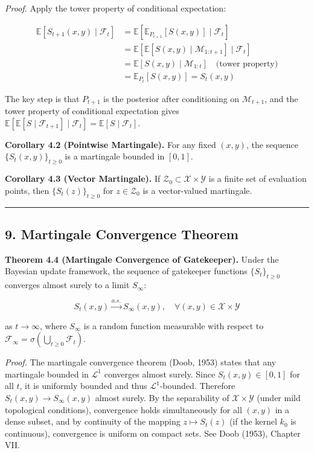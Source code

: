 \documentclass[
  12pt,
]{article}
\begin{document}
\emph{Proof.} Apply the tower property of conditional expectation:

\[
\begin{aligned}
\mathbb{E}[S_{t+1}(x,y) \mid \mathcal{F}_t] &= \mathbb{E}[\mathbb{E}_{P_{t+1}}[S(x,y)] \mid \mathcal{F}_t] \\
&= \mathbb{E}[\mathbb{E}[S(x,y) \mid \mathcal{M}_{1:t+1}] \mid \mathcal{F}_t] \\
&= \mathbb{E}[S(x,y) \mid \mathcal{M}_{1:t}] \quad \text{(tower property)} \\
&= \mathbb{E}_{P_t}[S(x,y)] = S_t(x,y)
\end{aligned}
\]

The key step is that \(P_{t+1}\) is the posterior after conditioning on
\(\mathcal{M}_{t+1}\), and the tower property of conditional expectation
gives
\(\mathbb{E}[\mathbb{E}[S \mid \mathcal{F}_{t+1}] \mid \mathcal{F}_t] = \mathbb{E}[S \mid \mathcal{F}_t]\).

\textbf{Corollary 4.2 (Pointwise Martingale).} For any fixed \((x,y)\),
the sequence \(\{S_t(x,y)\}_{t \geq 0}\) is a martingale bounded in
\([0,1]\).

\textbf{Corollary 4.3 (Vector Martingale).} If
\(\mathcal{Z}_0 \subset \mathcal{X} \times \mathcal{Y}\) is a finite set
of evaluation points, then \(\{S_t(z)\}_{t \geq 0}\) for
\(z \in \mathcal{Z}_0\) is a vector-valued martingale.

\begin{center}\rule{0.5\linewidth}{0.5pt}\end{center}

\subsection{9. Martingale Convergence
Theorem}\label{martingale-convergence-theorem}

\textbf{Theorem 4.4 (Martingale Convergence of Gatekeeper).} Under the
Bayesian update framework, the sequence of gatekeeper functions
\(\{S_t\}_{t \geq 0}\) converges almost surely to a limit \(S_\infty\):

\[
S_t(x,y) \xrightarrow{a.s.} S_\infty(x,y), \quad \forall (x,y) \in \mathcal{X} \times \mathcal{Y}
\]

as \(t \to \infty\), where \(S_\infty\) is a random function measurable
with respect to
\(\mathcal{F}_\infty = \sigma(\bigcup_{t \geq 0} \mathcal{F}_t)\).

\emph{Proof.} The martingale convergence theorem (Doob, 1953) states
that any martingale bounded in \(\mathcal{L}^1\) converges almost
surely. Since \(S_t(x,y) \in [0,1]\) for all \(t\), it is uniformly
bounded and thus \(\mathcal{L}^1\)-bounded. Therefore
\(S_t(x,y) \to S_\infty(x,y)\) almost surely. By the separability of
\(\mathcal{X} \times \mathcal{Y}\) (under mild topological conditions),
convergence holds simultaneously for all \((x,y)\) in a dense subset,
and by continuity of the mapping \(z \mapsto S_t(z)\) (if the kernel
\(k_0\) is continuous), convergence is uniform on compact sets. See Doob
(1953), Chapter VII.
\end{document}
